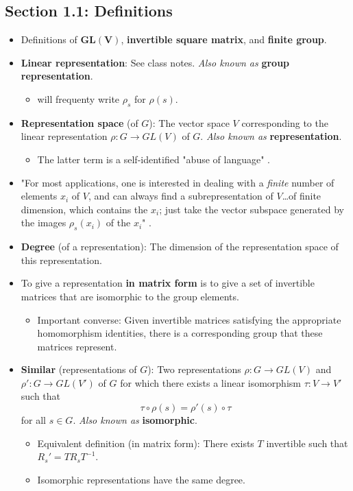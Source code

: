 \documentclass[../notes.tex]{subfiles}
\begin{document}
\subsection*{Section 1.1: Definitions}
\begin{itemize}
    \item Definitions of $\bm{GL(V)}$, \textbf{invertible square matrix}, and \textbf{finite group}.
    \item \textbf{Linear representation}: See class notes. \emph{Also known as} \textbf{group representation}.
    \begin{itemize}
        \item \textcite{bib:Serre} will frequenty write $\rho_s$ for $\rho(s)$.
    \end{itemize}
    \item \textbf{Representation space} (of $G$): The vector space $V$ corresponding to the linear representation $
    \rho:G\to GL(V)$ of $G$. \emph{Also known as} \textbf{representation}.
    \begin{itemize}
        \item The latter term is a self-identified "abuse of language" \parencite[3]{bib:Serre}.
    \end{itemize}
    \item "For most applications, one is interested in dealing with a \emph{finite} number of elements $x_i$ of $V$, and can always find a subrepresentation of $V$\dots of finite dimension, which contains the $x_i$; just take the vector subspace generated by the images $\rho_s(x_i)$ of the $x_i$" \parencite[4]{bib:Serre}.
    \item \textbf{Degree} (of a representation): The dimension of the representation space of this representation.
    \item To give a representation \textbf{in matrix form} is to give a set of invertible matrices that are isomorphic to the group elements.
    \begin{itemize}
        \item Important converse: Given invertible matrices satisfying the appropriate homomorphism identities, there is a corresponding group that these matrices represent.
    \end{itemize}
    \item \textbf{Similar} (representations of $G$): Two representations $\rho:G\to GL(V)$ and $\rho':G\to GL(V')$ of $G$ for which there exists a linear isomorphism $\tau:V\to V'$ such that
    \begin{equation*}
        \tau\circ\rho(s) = \rho'(s)\circ\tau
    \end{equation*}
    for all $s\in G$. \emph{Also known as} \textbf{isomorphic}.
    \begin{itemize}
        \item Equivalent definition (in matrix form): There exists $T$ invertible such that $R_s'=TR_sT^{-1}$.
        \item Isomorphic representations have the same degree.
    \end{itemize}
\end{itemize}
\end{document}
